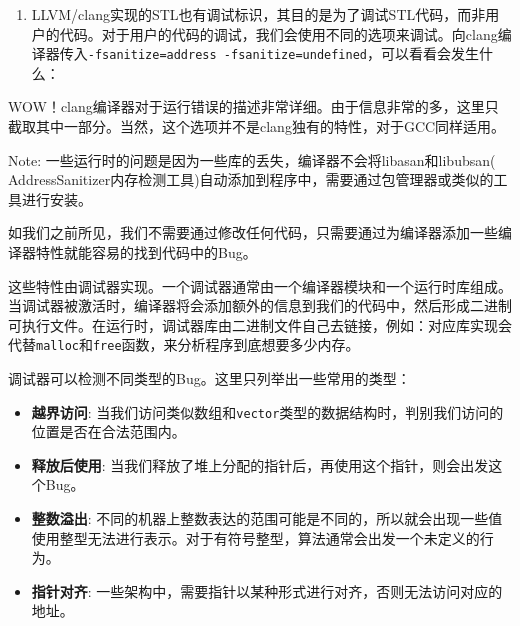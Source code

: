 \begin{enumerate}

\item LLVM/clang实现的STL也有调试标识，其目的是为了调试STL代码，而非用户的代码。对于用户的代码的调试，我们会使用不同的选项来调试。向clang编译器传入\texttt{-fsanitize=address -fsanitize=undefined}，可以看看会发生什么：


\end{enumerate}

WOW！clang编译器对于运行错误的描述非常详细。由于信息非常的多，这里只截取其中一部分。当然，这个选项并不是clang独有的特性，对于GCC同样适用。

\begin{myInfoBox}
Note: 一些运行时的问题是因为一些库的丢失，编译器不会将libasan和libubsan( AddressSanitizer内存检测工具)自动添加到程序中，需要通过包管理器或类似的工具进行安装。
\end{myInfoBox}


如我们之前所见，我们不需要通过修改任何代码，只需要通过为编译器添加一些编译器特性就能容易的找到代码中的Bug。

这些特性由调试器实现。一个调试器通常由一个编译器模块和一个运行时库组成。当调试器被激活时，编译器将会添加额外的信息到我们的代码中，然后形成二进制可执行文件。在运行时，调试器库由二进制文件自己去链接，例如：对应库实现会代替\texttt{malloc}和\texttt{free}函数，来分析程序到底想要多少内存。

调试器可以检测不同类型的Bug。这里只列举出一些常用的类型：

\begin{itemize}
\item \textbf{越界访问}: 当我们访问类似数组和\texttt{vector}类型的数据结构时，判别我们访问的位置是否在合法范围内。

\item \textbf{释放后使用}: 当我们释放了堆上分配的指针后，再使用这个指针，则会出发这个Bug。

\item \textbf{整数溢出}: 不同的机器上整数表达的范围可能是不同的，所以就会出现一些值使用整型无法进行表示。对于有符号整型，算法通常会出发一个未定义的行为。

\item \textbf{指针对齐}: 一些架构中，需要指针以某种形式进行对齐，否则无法访问对应的地址。

\end{itemize}

